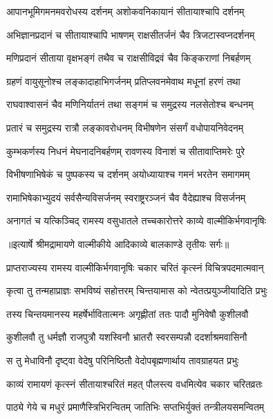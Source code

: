 \twolineshloka
{आपानभूमिगमनमवरोधस्य दर्शनम्}
{अशोकवनिकायानं सीतायाश्चापि दर्शनम्} %

\twolineshloka
{अभिज्ञानप्रदानं च सीतायाश्चापि भाषणम्}
{राक्षसीतर्जनं चैव त्रिजटास्वप्नदर्शनम्} %

\twolineshloka
{मणिप्रदानं सीताया वृक्षभङ्गं तथैव च}
{राक्षसीविद्रवं चैव किङ्कराणां निबर्हणम्} %

\twolineshloka
{ग्रहणं वायुसूनोश्च लङ्कादाहाभिगर्जनम्}
{प्रतिप्लवनमेवाथ मधूनां हरणं तथा} %

\twolineshloka
{राघवाश्वासनं चैव मणिनिर्यातनं तथा}
{सङ्गमं च समुद्रस्य नलसेतोश्च बन्धनम्} %

\twolineshloka
{प्रतारं च समुद्रस्य रात्रौ लङ्कावरोधनम्}
{विभीषणेन संसर्गं वधोपायनिवेदनम्} %

\twolineshloka
{कुम्भकर्णस्य निधनं मेघनादनिबर्हणम्}
{रावणस्य विनाशं च सीतावाप्तिमरेः पुरे} %

\twolineshloka
{विभीषणाभिषेकं च पुष्पकस्य च दर्शनम्}
{अयोध्यायाश्च गमनं भरतेन समागमम्} %

\twolineshloka
{रामाभिषेकाभ्युदयं सर्वसैन्यविसर्जनम्}
{स्वराष्ट्ररञ्जनं चैव वैदेह्याश्च विसर्जनम्} %

\twolineshloka
{अनागतं च यत्किञ्चिद् रामस्य वसुधातले}
{तच्चकारोत्तरे काव्ये वाल्मीकिर्भगवानृषिः} %


{॥इत्यार्षे श्रीमद्रामायणे वाल्मीकीये आदिकाव्ये बालकाण्डे तृतीयः सर्गः॥}


\twolineshloka
{प्राप्तराज्यस्य रामस्य वाल्मीकिर्भगवानृषिः}
{चकार चरितं कृत्स्नं विचित्रपदमात्मवान्} %

\twolineshloka
{कृत्वा तु तन्महाप्राज्ञः सभविष्यं सहोत्तरम्}
{चिन्तयामास को न्वेतत्प्रयुञ्जीयादिति प्रभुः} %

\twolineshloka
{तस्य चिन्तयमानस्य महर्षेर्भावितात्मनः}
{अगृह्णीतां ततः पादौ मुनिवेषौ कुशीलवौ} %

\twolineshloka
{कुशीलवौ तु धर्मज्ञौ राजपुत्रौ यशस्विनौ}
{भ्रातरौ स्वरसम्पन्नौ ददर्शाश्रमवासिनौ} %

\twolineshloka
{स तु मेधाविनौ दृष्ट्वा वेदेषु परिनिष्ठितौ}
{वेदोपबृह्मणार्थाय तावग्राहयत प्रभुः} %

\twolineshloka
{काव्यं रामायणं कृत्स्नं सीतायाश्चरितं महत्}
{पौलस्त्य वधमित्येव चकार चरितव्रतः} %

\twolineshloka
{पाठ्ये गेये च मधुरं प्रमाणैस्त्रिभिरन्वितम्}
{जातिभिः सप्तभिर्युक्तं तन्त्रीलयसमन्वितम्} %

